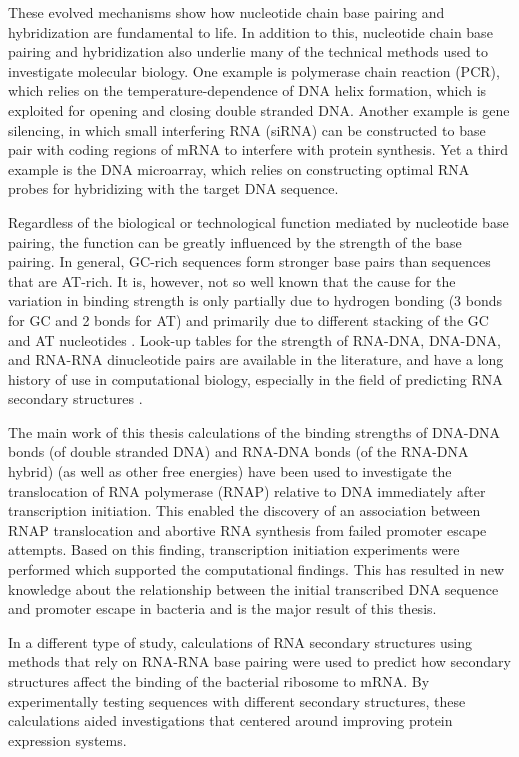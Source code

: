These evolved mechanisms show how nucleotide chain base pairing and
hybridization are fundamental to life. In addition to this, nucleotide chain
base pairing and hybridization also underlie many of the technical methods used
to investigate molecular biology. One example is polymerase chain reaction
(PCR), which relies on the temperature-dependence of DNA helix formation, which
is exploited for opening and closing double stranded DNA. Another example is
gene silencing, in which small interfering RNA (siRNA) can be constructed to
base pair with coding regions of mRNA to interfere with protein synthesis. Yet
a third example is the DNA microarray, which relies on constructing optimal RNA
probes for hybridizing with the target DNA sequence.

Regardless of the biological or technological function mediated by nucleotide
base pairing, the function can be greatly influenced by the strength of the
base pairing. In general, GC-rich sequences form stronger base pairs than
sequences that are AT-rich. It is, however, not so well known that the cause
for the variation in binding strength is only partially due to hydrogen bonding
(3 bonds for GC and 2 bonds for AT) and primarily due to different stacking of
the GC and AT nucleotides \cite{yakovchuk_base-stacking_2006}. Look-up tables
for the strength of RNA-DNA, DNA-DNA, and RNA-RNA dinucleotide pairs are
available in the literature, and have a long history of use in computational
biology, especially in the field of predicting RNA secondary structures
\cite{mathews_prediction_2006}.

The main work of this thesis calculations of the binding strengths of DNA-DNA
bonds (of double stranded DNA) and RNA-DNA bonds (of the RNA-DNA hybrid) (as
well as other free energies) have been used to investigate the translocation of
RNA polymerase (RNAP) relative to DNA immediately after transcription
initiation. This enabled the discovery of an association between RNAP
translocation and abortive RNA synthesis from failed promoter escape attempts.
Based on this finding, transcription initiation experiments were performed
which supported the computational findings. This has resulted in new knowledge
about the relationship between the initial transcribed DNA sequence and
promoter escape in bacteria and is the major result of this thesis.

In a different type of study, calculations of RNA secondary structures using
methods that rely on RNA-RNA base pairing were used to predict how secondary
structures affect the binding of the bacterial ribosome to mRNA. By
experimentally testing sequences with different secondary structures, these
calculations aided investigations that centered around improving protein
expression systems.

